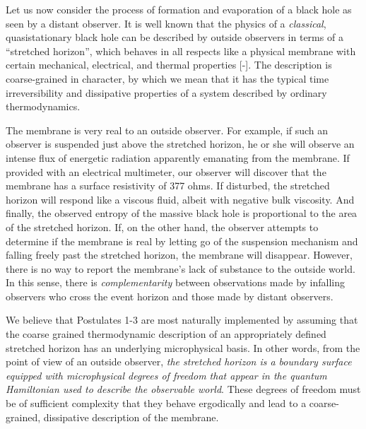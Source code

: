 Let us now consider the process of formation and evaporation of a
black hole as seen by a distant observer.  It is well known that the
physics of a {\it classical\/}, quasistationary black hole can be
described by outside observers in terms of a ``stretched horizon'',
which behaves in all respects like a physical membrane with certain
mechanical, electrical, and thermal properties [\hrhz-\Mempar].  The
description is coarse-grained in character, by which we mean that it
has the typical time irreversibility and dissipative properties of a
system described by ordinary thermodynamics.

The membrane is very real to an outside observer.  For example, if
such an observer is suspended just above the stretched horizon, he or
she will observe an intense flux of energetic radiation apparently
emanating from the membrane.  If provided with an electrical
multimeter, our observer will discover that the membrane has a
surface resistivity of 377 ohms.  If disturbed, the stretched horizon
will respond like a viscous fluid, albeit with negative bulk
viscosity.  And finally, the observed entropy of the massive black
hole is proportional to the area of the stretched horizon.  If, on
the other hand, the observer attempts to determine if the membrane is
real by letting go of the suspension mechanism and falling freely
past the stretched horizon, the membrane will disappear.  However,
there is no way to report the membrane's lack of substance to the
outside world.  In this sense, there is {\it complementarity\/}
between observations made by infalling observers who cross the event
horizon and those made by distant observers.

We believe that Postulates 1-3 are most naturally implemented by
assuming that the coarse grained thermodynamic description of an
appropriately defined stretched horizon has an underlying
microphysical basis.  In other words, from the point of view of an
outside observer, {\it the stretched horizon is a boundary surface
equipped with microphysical degrees of freedom that appear in the
quantum Hamiltonian used to describe the observable world}.  These
degrees of freedom must be of sufficient complexity that they behave
ergodically and lead to a coarse-grained, dissipative description of
the membrane.

